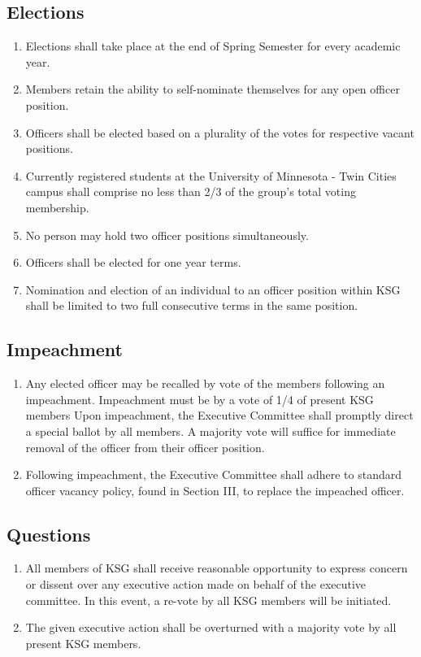 \documentclass[12pt,executivepaper]{article}
\begin{document}
\subsection{Elections}
\begin{enumerate}
    \item Elections shall take place at the end of Spring Semester for every academic year.
    \item Members retain the ability to self-nominate themselves for any open officer position.
    \item Officers shall be elected based on a plurality of the votes for respective vacant
          positions.
    \item Currently registered students at the University of Minnesota - Twin Cities campus
          shall comprise no less than 2/3 of the group's total voting membership. 
    \item No person may hold two officer positions simultaneously.
    \item Officers shall be elected for one year terms.
    \item Nomination and election of an individual to an officer position within KSG shall be
          limited to two full consecutive terms in the same position.
\end{enumerate}

\subsection{Impeachment}
\begin{enumerate}
    \item Any elected officer may be recalled by vote of the members following an
          impeachment. Impeachment must be by a vote of 1/4 of present KSG members
          Upon impeachment, the Executive Committee shall promptly direct a special
          ballot by all members. A majority vote will suffice for immediate removal
          of the officer from their officer position.
    \item Following impeachment, the Executive Committee shall adhere to
          standard officer vacancy policy, found in Section III, to replace the
          impeached officer.
\end{enumerate}

\subsection{Questions}
\begin{enumerate}
    \item All members of KSG shall receive reasonable opportunity to express concern
          or dissent over any executive action made on behalf of the executive committee.
          In this event, a re-vote by all KSG members will be initiated.
    \item The given executive action shall be overturned with a majority vote by
          all present KSG members.
\end{enumerate}
\end{document}
